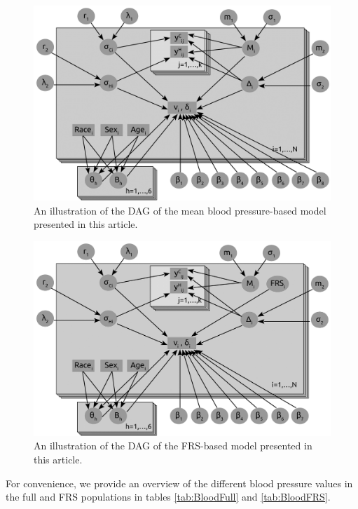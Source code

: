 \documentclass[
]{article}
\begin{document}
\begin{figure}
\hypertarget{fig:DAGmean}{%
\centering
\includegraphics{./DAG_Mean.png}
\caption{An illustration of the DAG of the mean blood pressure-based model presented in this article.}\label{fig:DAGmean}
}
\end{figure}

\begin{figure}
\hypertarget{fig:DAGFRS}{%
\centering
\includegraphics{./DAG_FRS.png}
\caption{An illustration of the DAG of the FRS-based model presented in this article.}\label{fig:DAGFRS}
}
\end{figure}

For convenience, we provide an overview of the different blood pressure values in the full and FRS populations in tables \ref{tab:BloodFull} and \ref{tab:BloodFRS}.
\end{document}
